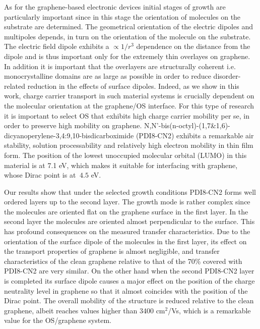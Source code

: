 \documentclass[preprint,aip,jap]{revtex4-2}
\begin{document}
As for the graphene-based electronic devices initial stages of growth are particularly important since in this stage the orientation of molecules on the substrate are determined. The geometrical orientation of the electric dipoles and multipoles depends, in turn on the orientation of the molecule on the substrate\cite{geng-2012}. The electric field dipole exhibits a $\propto 1/r^{3}$ dependence on the distance from the dipole and is thus important only for the extremely thin overlayes on graphene. In addition it is important that the overlayers are structurally coherent i.e. monocrystalline domains are as large as possible in order to reduce disorder-related reduction in the effects of surface dipoles. Indeed, as  we show in this work, charge carrier transport in such material systems is crucially dependent on the molecular orientation at the graphene/OS interface. For this type of research it is important to select OS that exhibits high charge carrier mobility per se, in order to preserve high mobility on graphene.   N,N'-bis(n-octyl)-(1,7\&1,6)-dicyanoperylene-3,4:9,10-bisdicarboximide (PDI8-CN2)
 exhibits a remarkable air stability, solution processability and relatively high electron mobility in thin film form\cite{jung-2014,molinari-2009,piliego-2009a}.  The position of the lowest unoccupied molecular orbital (LUMO) in this material is at 7.1 eV\cite{jung-2014}, which makes it suitable for interfacing with graphene, whose Dirac point is at $~4.5$ eV.

Our results show that under the selected growth conditions PDI8-CN2 forms well ordered layers up to the second layer. The growth mode is rather complex since the molecules are oriented flat on the graphene surface in the first layer. In the second layer the molecules are oriented almost perpendicular to the surface. This has profound consequences on the measured transfer characteristics. Due to the orientation of the surface dipole of the molecules in the first layer, its effect on the transport properties of graphene is almost negligible, and transfer characteristics of the clean graphene relative to that of the 70\% covered with PDI8-CN2 are very similar. On the other hand when the second PDI8-CN2 layer is completed its surface dipole causes a major effect on the position of the charge neutrality level in graphene so that it almost coincides with the position of the Dirac point.  The overall mobility of the structure is reduced relative to the clean graphene, albeit reaches values higher than 3400 cm$^{2}$/Vs, which is a remarkable value for the OS/graphene system. 
\end{document}
